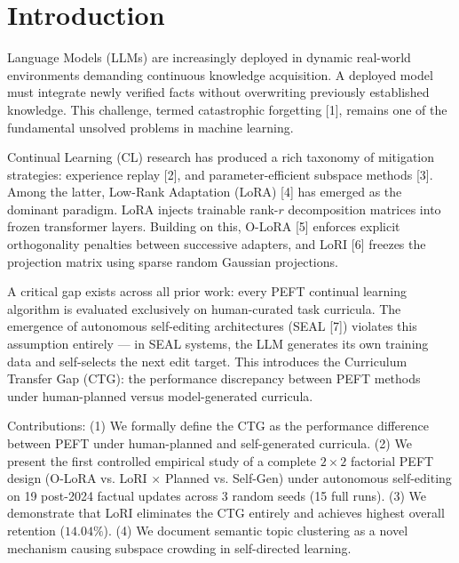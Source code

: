 \documentclass[10pt,journal,compsoc]{IEEEtran}
\begin{document}
\maketitle
\IEEEdisplaynontitleabstractindextext
\IEEEpeerreviewmaketitle

\section{Introduction}
 Language Models (LLMs) are increasingly deployed in dynamic real-world environments demanding continuous knowledge acquisition. A deployed model must integrate newly verified facts without overwriting previously established knowledge. This challenge, termed catastrophic forgetting [1], remains one of the fundamental unsolved problems in machine learning.

Continual Learning (CL) research has produced a rich taxonomy of mitigation strategies: experience replay [2], and parameter-efficient subspace methods [3]. Among the latter, Low-Rank Adaptation (LoRA) [4] has emerged as the dominant paradigm. LoRA injects trainable rank-$r$ decomposition matrices into frozen transformer layers. Building on this, O-LoRA [5] enforces explicit orthogonality penalties between successive adapters, and LoRI [6] freezes the projection matrix using sparse random Gaussian projections.

A critical gap exists across all prior work: every PEFT continual learning algorithm is evaluated exclusively on human-curated task curricula. The emergence of autonomous self-editing architectures (SEAL [7]) violates this assumption entirely --- in SEAL systems, the LLM generates its own training data and self-selects the next edit target. This introduces the Curriculum Transfer Gap (CTG): the performance discrepancy between PEFT methods under human-planned versus model-generated curricula.

Contributions: (1) We formally define the CTG as the performance difference between PEFT under human-planned and self-generated curricula. (2) We present the first controlled empirical study of a complete $2 \times 2$ factorial PEFT design (O-LoRA vs. LoRI $\times$ Planned vs. Self-Gen) under autonomous self-editing on 19 post-2024 factual updates across 3 random seeds (15 full runs). (3) We demonstrate that LoRI eliminates the CTG entirely and achieves highest overall retention ($14.04\%$). (4) We document semantic topic clustering as a novel mechanism causing subspace crowding in self-directed learning.
\end{document}
